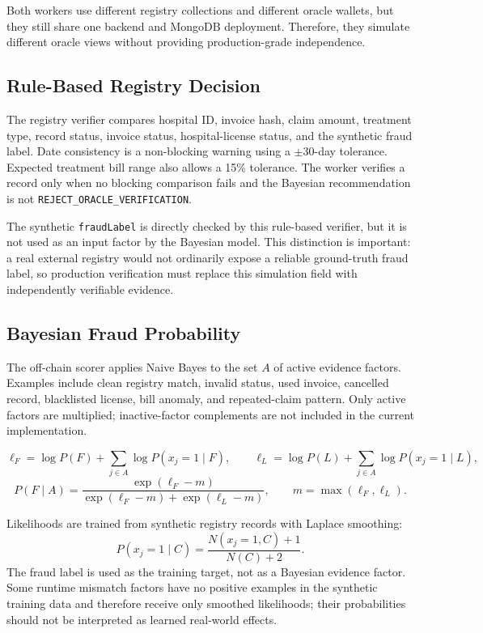 Both workers use different registry collections and different oracle wallets,
but they still share one backend and MongoDB deployment. Therefore, they
simulate different oracle views without providing production-grade
independence.

\subsection{Rule-Based Registry Decision}

The registry verifier compares hospital ID, invoice hash, claim amount,
treatment type, record status, invoice status, hospital-license status, and the
synthetic fraud label. Date consistency is a non-blocking warning using a
\(\pm30\)-day tolerance. Expected treatment bill range also allows a 15\%
tolerance. The worker verifies a record only when no blocking comparison fails
and the Bayesian recommendation is not
\texttt{REJECT\_ORACLE\_VERIFICATION}.

The synthetic \texttt{fraudLabel} is directly checked by this rule-based
verifier, but it is not used as an input factor by the Bayesian model. This
distinction is important: a real external registry would not ordinarily expose
a reliable ground-truth fraud label, so production verification must replace
this simulation field with independently verifiable evidence.

\subsection{Bayesian Fraud Probability}

The off-chain scorer applies Naive Bayes to the set \(A\) of active evidence
factors. Examples include clean registry match, invalid status, used invoice,
cancelled record, blacklisted license, bill anomaly, and repeated-claim pattern.
Only active factors are multiplied; inactive-factor complements are not included
in the current implementation.

\begin{equation}
\ell_F=\log P(F)+\sum_{j\in A}\log P(x_j=1\mid F),
\qquad
\ell_L=\log P(L)+\sum_{j\in A}\log P(x_j=1\mid L),
\label{eq:bayes_logs}
\end{equation}
\begin{equation}
P(F\mid A)=
\frac{\exp(\ell_F-m)}
{\exp(\ell_F-m)+\exp(\ell_L-m)},
\qquad
m=\max(\ell_F,\ell_L).
\label{eq:bayes_posterior}
\end{equation}

Likelihoods are trained from synthetic registry records with Laplace smoothing:
\begin{equation}
P(x_j=1\mid C)=
\frac{N(x_j=1,C)+1}{N(C)+2}.
\label{eq:laplace}
\end{equation}
The fraud label is used as the training target, not as a Bayesian evidence
factor. Some runtime mismatch factors have no positive examples in the
synthetic training data and therefore receive only smoothed likelihoods; their
probabilities should not be interpreted as learned real-world effects.

